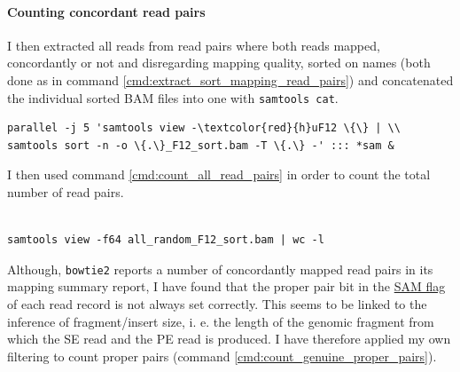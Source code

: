 \documentclass[a4paper,12pt,times,print,index,custombib,custommargin]{PhDThesisPSnPDF}\usepackage[]{graphicx}\usepackage[]{color}
\begin{document}
\paragraph{Counting \gls{concordant} read pairs}
I then extracted all reads from read pairs where both reads mapped, \gls{concordant}ly or not and disregarding mapping quality, sorted on names (both done as in command \ref{cmd:extract_sort_mapping_read_pairs}) and concatenated the individual sorted BAM files into one with \texttt{samtools cat}.
%
\begin{cmd}
\captionsetup{type=cmd}
\begin{Verbatim}[fontsize=\scriptsize, commandchars=\\\{\}]
parallel -j 5 'samtools view -\textcolor{red}{h}uF12 \{\} | \\
samtools sort -n -o \{.\}_F12_sort.bam -T \{.\} -' ::: *sam &
\end{Verbatim}
\caption{\small This command line extracts from each individual read mapping output file (in \gls{SAM} format) those read pairs where both reads mapped (\texttt{-F12}) and then sorts these SAM records by read name, which is necessary for concatenating the individual files into one with \texttt{samtools cat}.}
\label{cmd:extract_sort_mapping_read_pairs}
\end{cmd}
%
I then used command \ref{cmd:count_all_read_pairs} in order to count the total number of read pairs.
%
\begin{cmd}
\captionsetup{type=cmd}
\begin{Verbatim}[fontsize=\scriptsize, formatcom=\color{darkgray}]

samtools view -f64 all_random_F12_sort.bam | wc -l
\end{Verbatim}
\caption{\small This command line counts the number of SE reads (first in pair) in a mapping output file (binary \gls{SAM} format).}
\label{cmd:count_all_read_pairs}
\end{cmd}
%
Although, \texttt{bowtie2} reports a number of \gls{concordant}ly mapped read pairs in its mapping summary report, I have found that the \gls{proper pair} bit in the \href{http://samtools.github.io/hts-specs/SAMv1.pdf}{SAM flag} of each read record is not always set correctly. This seems to be linked to the inference of fragment/insert size, i. e. the length of the genomic fragment from which the SE read and the PE read is produced. I have therefore applied my own filtering to count \glspl{proper pair} (command \ref{cmd:count_genuine_proper_pairs}).
%
\end{document}
